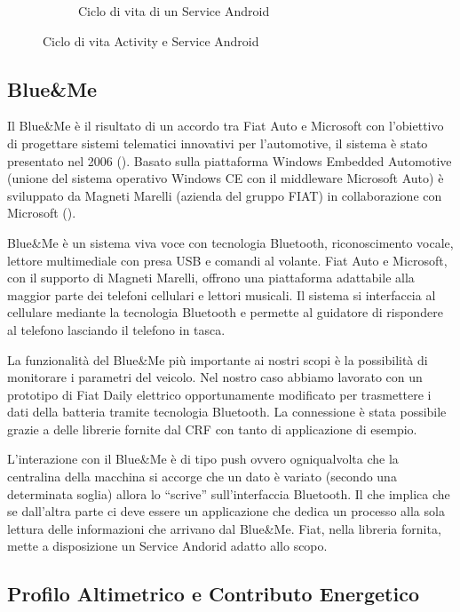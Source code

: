 \begin{figure}[H]
\begin{subfigure}[b]{0.49\textwidth}
			\caption{Ciclo di vita di un Service Android}
			\label{fig:android-service}
		\end{subfigure}
        \caption{Ciclo di vita Activity e Service Android}
\end{figure}

\subsection{Blue\&{}Me}

Il Blue\&{}Me è il risultato di un accordo tra Fiat Auto e Microsoft con l'obiettivo di progettare sistemi telematici innovativi per l'automotive, il sistema è stato presentato nel 2006 (\cite{al2012android}). Basato sulla piattaforma Windows Embedded Automotive (unione del sistema operativo Windows CE con il middleware Microsoft Auto) è sviluppato da Magneti Marelli (azienda del gruppo FIAT) in collaborazione con Microsoft (\cite{wiki:blue-me}).

Blue\&{}Me è un sistema viva voce con tecnologia Bluetooth, riconoscimento vocale, lettore multimediale con presa USB e comandi al volante. Fiat Auto e Microsoft, con il supporto di Magneti Marelli, offrono una piattaforma adattabile alla maggior parte dei telefoni cellulari e lettori musicali. Il sistema si interfaccia al cellulare mediante la tecnologia Bluetooth e permette al guidatore di rispondere al telefono lasciando il telefono in tasca. 

La funzionalità del Blue\&{}Me più importante ai nostri scopi è la possibilità di monitorare i parametri del veicolo. Nel nostro caso abbiamo lavorato con un prototipo di Fiat Daily elettrico opportunamente modificato per trasmettere i dati della batteria tramite tecnologia Bluetooth. La connessione è stata possibile grazie a delle librerie fornite dal CRF con tanto di applicazione di esempio.

L'interazione con il Blue\&{}Me è di tipo push ovvero ogniqualvolta che la centralina della macchina si accorge che un dato è variato (secondo una determinata soglia) allora lo ``scrive'' sull'interfaccia Bluetooth. Il che implica che se dall'altra parte ci deve essere un applicazione che dedica un processo alla sola lettura delle informazioni che arrivano dal Blue\&{}Me. Fiat, nella libreria fornita, mette a disposizione un Service Andorid adatto allo scopo.

\subsection{Profilo Altimetrico e Contributo Energetico}

